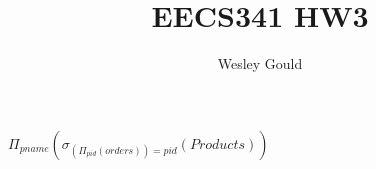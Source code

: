 \documentclass{article}
\author{Wesley Gould}
\title{EECS341 HW3}
\begin{document}
\maketitle

\section{}
$\Pi_{pname} (\sigma_{(\Pi_{pid} (orders)) = pid}(Products))$

\section{}


\section{}


\section{}


\section{}
\end{document}
